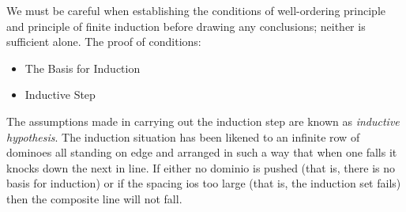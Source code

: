 \begin{definition}
We must be careful when establishing the conditions of well-ordering principle and principle of finite induction before drawing any conclusions; neither is sufficient alone. The proof of conditions:
    \begin{itemize}
        \item The Basis for Induction
        \item Inductive Step
    \end{itemize}
The assumptions made in carrying out the induction step are known as \textit{inductive hypothesis}. The induction situation has been likened to an infinite row of dominoes all standing on edge and arranged in such a way that when one falls it knocks down the next in line. If either no dominio is pushed (that is, there is no basis for induction) or if the spacing ios too large (that is, the induction set fails) then the composite line will not fall. \\   
\end{definition}

